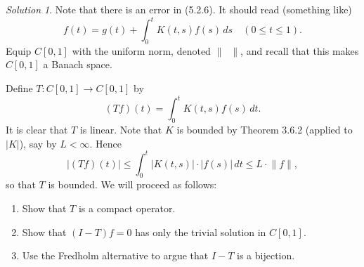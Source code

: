 \documentclass{report}
\newcommand{\norm}[1]{{\lVert #1 \rVert}}
\theoremstyle{remark}
\newtheorem*{solution}{Solution}
\begin{document}
\begin{solution}
  Note that there is an error in (5.2.6). It should read (something like)
  \begin{equation*}
    f(t) = g(t) + \int_0^t K(t,s) f(s) \, ds \quad (0 \le t \le 1).
  \end{equation*}
  Equip $C[0,1]$ with the uniform norm, denoted $\norm{\phantom x}$, and recall that this makes $C[0,1]$ a Banach space.

  Define $T: C[0,1] \to C[0,1]$ by
  \begin{equation*}
    (Tf)(t) = \int_0^t K(t,s) f(s) \, dt.
  \end{equation*}
  It is clear that $T$ is linear. Note that $K$ is bounded by Theorem 3.6.2 (applied to $|K|$), say by $L < \infty$. Hence
  \begin{equation*}
    |(Tf)(t)| \le \int_0^t |K(t,s)| \cdot |f(s)| \, dt \le L \cdot \norm f,
  \end{equation*}
  so that $T$ is bounded. We will proceed as follows:
  \begin{enumerate}[label=(\roman*)]
    \item Show that $T$ is a compact operator.
    \item Show that $(I-T)f = 0$ has only the trivial solution in $C[0,1]$.
    \item Use the Fredholm alternative to argue that $I-T$ is a bijection.
  \end{enumerate}


\end{solution}
\end{document}
